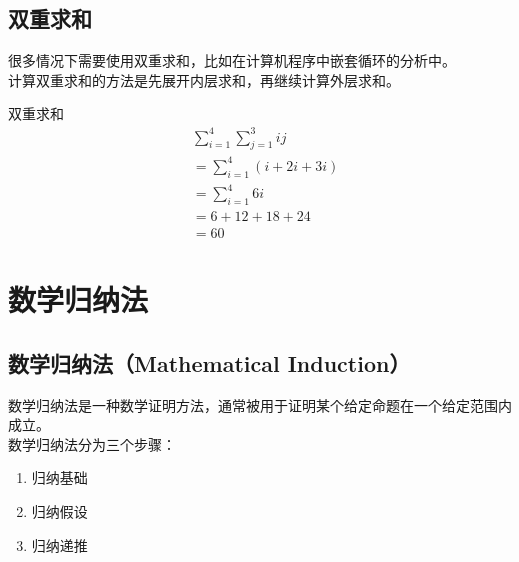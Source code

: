 \documentclass[12pt, openany, oneside]{book}
\begin{document}
\vspace{0.5cm}

\subsection{双重求和}

很多情况下需要使用双重求和，比如在计算机程序中嵌套循环的分析中。\\

计算双重求和的方法是先展开内层求和，再继续计算外层求和。

\begin{tcolorbox}
	双重求和
	\begin{align*}
		 & \sum_{i=1}^{4} \sum_{j=1}^{3} ij \\
		 & = \sum_{i=1}^{4} (i + 2i + 3i)   \\
		 & = \sum_{i=1}^{4} 6i              \\
		 & = 6 + 12 + 1 8 + 24              \\
		 & = 60
	\end{align*}
\end{tcolorbox}

\newpage

\section{数学归纳法}

\subsection{数学归纳法（Mathematical Induction）}

数学归纳法是一种数学证明方法，通常被用于证明某个给定命题在一个给定范围内成立。\\

数学归纳法分为三个步骤：

\begin{enumerate}
	\item 归纳基础
	\item 归纳假设
	\item 归纳递推
\end{enumerate}
\end{document}
